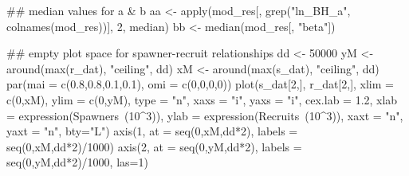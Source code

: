 \documentclass[11pt,]{article}
\newenvironment{Shaded}{}{}
\newcommand{\KeywordTok}[1]{\textcolor[rgb]{0.00,0.00,1.00}{#1}}
\newcommand{\DataTypeTok}[1]{#1}
\newcommand{\DecValTok}[1]{#1}
\newcommand{\FloatTok}[1]{#1}
\newcommand{\StringTok}[1]{\textcolor[rgb]{0.00,0.50,0.50}{#1}}
\newcommand{\OperatorTok}[1]{#1}
\newcommand{\NormalTok}[1]{#1}
\begin{document}
\begin{Shaded}
\begin{Highlighting}[]
\NormalTok{## median values for a & b}
\NormalTok{aa <-}\StringTok{ }\KeywordTok{apply}\NormalTok{(mod_res[, }\KeywordTok{grep}\NormalTok{(}\StringTok{"ln_BH_a"}\NormalTok{, }\KeywordTok{colnames}\NormalTok{(mod_res))], }\DecValTok{2}\NormalTok{, median)}
\NormalTok{bb <-}\StringTok{ }\KeywordTok{median}\NormalTok{(mod_res[, }\StringTok{"beta"}\NormalTok{])}



\NormalTok{## empty plot space for spawner-recruit relationships}
\NormalTok{dd <-}\StringTok{ }\DecValTok{50000}
\NormalTok{yM <-}\StringTok{ }\KeywordTok{around}\NormalTok{(}\KeywordTok{max}\NormalTok{(r_dat), }\StringTok{"ceiling"}\NormalTok{, dd)}
\NormalTok{xM <-}\StringTok{ }\KeywordTok{around}\NormalTok{(}\KeywordTok{max}\NormalTok{(s_dat), }\StringTok{"ceiling"}\NormalTok{, dd)}
\KeywordTok{par}\NormalTok{(}\DataTypeTok{mai =} \KeywordTok{c}\NormalTok{(}\FloatTok{0.8}\NormalTok{,}\FloatTok{0.8}\NormalTok{,}\FloatTok{0.1}\NormalTok{,}\FloatTok{0.1}\NormalTok{), }\DataTypeTok{omi =} \KeywordTok{c}\NormalTok{(}\DecValTok{0}\NormalTok{,}\DecValTok{0}\NormalTok{,}\DecValTok{0}\NormalTok{,}\DecValTok{0}\NormalTok{))}
\KeywordTok{plot}\NormalTok{(s_dat[}\DecValTok{2}\NormalTok{,], r_dat[}\DecValTok{2}\NormalTok{,], }\DataTypeTok{xlim =} \KeywordTok{c}\NormalTok{(}\DecValTok{0}\NormalTok{,xM), }\DataTypeTok{ylim =} \KeywordTok{c}\NormalTok{(}\DecValTok{0}\NormalTok{,yM), }\DataTypeTok{type =} \StringTok{"n"}\NormalTok{,}
     \DataTypeTok{xaxs =} \StringTok{"i"}\NormalTok{, }\DataTypeTok{yaxs =} \StringTok{"i"}\NormalTok{, }\DataTypeTok{cex.lab =} \FloatTok{1.2}\NormalTok{,}
     \DataTypeTok{xlab =} \KeywordTok{expression}\NormalTok{(Spawners}\OperatorTok{~}\NormalTok{(}\DecValTok{10}\OperatorTok{^}\DecValTok{3}\NormalTok{)),}
     \DataTypeTok{ylab =} \KeywordTok{expression}\NormalTok{(Recruits}\OperatorTok{~}\NormalTok{(}\DecValTok{10}\OperatorTok{^}\DecValTok{3}\NormalTok{)),}
     \DataTypeTok{xaxt =} \StringTok{"n"}\NormalTok{, }\DataTypeTok{yaxt =} \StringTok{"n"}\NormalTok{, }\DataTypeTok{bty=}\StringTok{"L"}\NormalTok{)}
\KeywordTok{axis}\NormalTok{(}\DecValTok{1}\NormalTok{, }\DataTypeTok{at =} \KeywordTok{seq}\NormalTok{(}\DecValTok{0}\NormalTok{,xM,dd}\OperatorTok{*}\DecValTok{2}\NormalTok{), }\DataTypeTok{labels =} \KeywordTok{seq}\NormalTok{(}\DecValTok{0}\NormalTok{,xM,dd}\OperatorTok{*}\DecValTok{2}\NormalTok{)}\OperatorTok{/}\DecValTok{1000}\NormalTok{)}
\KeywordTok{axis}\NormalTok{(}\DecValTok{2}\NormalTok{, }\DataTypeTok{at =} \KeywordTok{seq}\NormalTok{(}\DecValTok{0}\NormalTok{,yM,dd}\OperatorTok{*}\DecValTok{2}\NormalTok{), }\DataTypeTok{labels =} \KeywordTok{seq}\NormalTok{(}\DecValTok{0}\NormalTok{,yM,dd}\OperatorTok{*}\DecValTok{2}\NormalTok{)}\OperatorTok{/}\DecValTok{1000}\NormalTok{, }\DataTypeTok{las=}\DecValTok{1}\NormalTok{)}


\end{Highlighting}
\end{Shaded}
\end{document}
